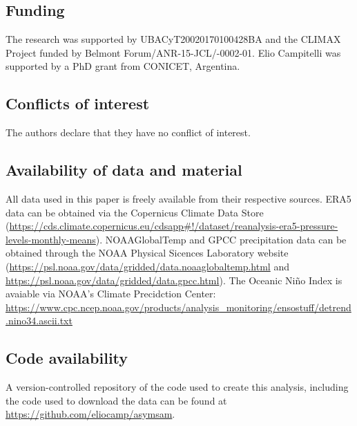 \documentclass[smallextended]{svjour3}       %
\begin{document}
\hypertarget{funding}{%
\subsection*{Funding}\label{funding}}

The research was supported by UBACyT20020170100428BA and the CLIMAX Project funded by Belmont Forum/ANR-15-JCL/-0002-01. Elio Campitelli was supported by a PhD grant from CONICET, Argentina.

\hypertarget{conflicts-of-interest}{%
\subsection*{Conflicts of interest}\label{conflicts-of-interest}}

The authors declare that they have no conflict of interest.

\hypertarget{availability-of-data-and-material}{%
\subsection*{Availability of data and material}\label{availability-of-data-and-material}}

All data used in this paper is freely available from their respective sources. ERA5 data can be obtained via the Copernicus Climate Data Store (\url{https://cds.climate.copernicus.eu/cdsapp\#!/dataset/reanalysis-era5-pressure-levels-monthly-means}). NOAAGlobalTemp and GPCC precipitation data can be obtained through the NOAA Physical Sicences Laboratory website (\url{https://psl.noaa.gov/data/gridded/data.noaaglobaltemp.html} and \url{https://psl.noaa.gov/data/gridded/data.gpcc.html}). The Oceanic Niño Index is avaiable via NOAA's Climate Precidction Center: \url{https://www.cpc.ncep.noaa.gov/products/analysis_monitoring/ensostuff/detrend.nino34.ascii.txt}

\hypertarget{code-availability}{%
\subsection*{Code availability}\label{code-availability}}

A version-controlled repository of the code used to create this analysis, including the code used to download the data can be found at \url{https://github.com/eliocamp/asymsam}.
\end{document}
